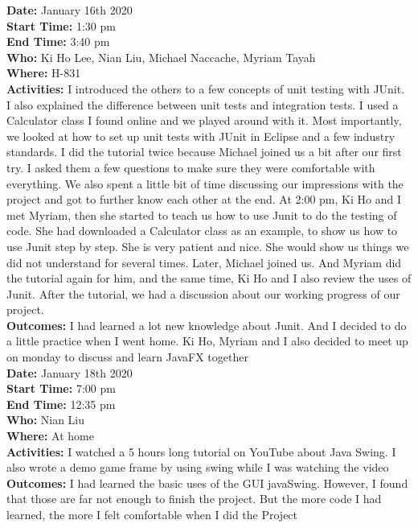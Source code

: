 \documentclass[12pt]{article}
\begin{document}
{\bf Date:} January 16th 2020\\
{\bf Start Time:} 1:30 pm\\
{\bf End Time:} 3:40 pm \\
{\bf Who:} Ki Ho Lee, Nian Liu, Michael Naccache, Myriam Tayah\\
{\bf Where:} H-831 \\
{\bf Activities:} I introduced the others to a few concepts of unit testing with JUnit. I also explained the difference between unit tests and integration tests. I used a Calculator class I found online and we played around with it. Most importantly, we looked at how to set up unit tests with JUnit in Eclipse and a few industry standards. I did the tutorial twice because Michael joined us a bit after our first try. I asked them a few questions to make sure they were comfortable with everything. We also spent a little bit of time discussing our impressions with the project and got to further know each other at the end. 
At 2:00 pm, Ki Ho and I met Myriam, then she started to teach us how to use Junit to do the testing of code. She had downloaded a Calculator class as an example, to show us how to use Junit step by step. She is very patient and nice. She would show us things we did not understand for several times. Later, Michael joined us. And Myriam did the tutorial again for him, and the same time, Ki Ho and I also review the uses of Junit. After the tutorial, we had a discussion about our working progress of our project. \\
{\bf Outcomes:} I had learned a lot new knowledge about Junit. And I decided to do a little practice when I went home. Ki Ho, Myriam and I also decided to meet up on monday to discuss and learn JavaFX together\\

{\bf Date:} January 18th 2020\\
{\bf Start Time:} 7:00 pm\\
{\bf End Time:} 12:35 pm \\
{\bf Who:} Nian Liu \\
{\bf Where:} At home \\
{\bf Activities:} I watched a 5 hours long tutorial on YouTube about Java Swing. I also wrote a demo game frame by using swing while I was watching the video\\
{\bf Outcomes:} I had learned the basic uses of the GUI javaSwing. However, I found that those are far not enough to finish the project. But the more code I had learned, the more I felt comfortable when I did the Project\\
\end{document}
